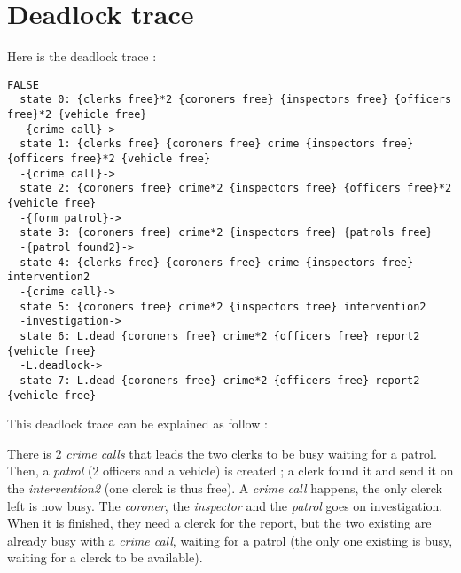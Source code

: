 \section{Deadlock trace}
\label{sec:Deadlock trace}

Here is the deadlock trace :

\begin{lstlisting}
FALSE
  state 0: {clerks free}*2 {coroners free} {inspectors free} {officers free}*2 {vehicle free}
  -{crime call}->
  state 1: {clerks free} {coroners free} crime {inspectors free} {officers free}*2 {vehicle free}
  -{crime call}->
  state 2: {coroners free} crime*2 {inspectors free} {officers free}*2 {vehicle free}
  -{form patrol}->
  state 3: {coroners free} crime*2 {inspectors free} {patrols free}
  -{patrol found2}->
  state 4: {clerks free} {coroners free} crime {inspectors free} intervention2
  -{crime call}->
  state 5: {coroners free} crime*2 {inspectors free} intervention2
  -investigation->
  state 6: L.dead {coroners free} crime*2 {officers free} report2 {vehicle free}
  -L.deadlock->
  state 7: L.dead {coroners free} crime*2 {officers free} report2 {vehicle free}
\end{lstlisting}

This deadlock trace can be explained as follow : \newline

There is 2 \textit{crime calls} that leads the two clerks to be busy waiting for a patrol. Then, a \textit{patrol} (2 officers and a vehicle) is created ; a clerk found it and send it on the \textit{intervention2} (one clerck is thus free). A \textit{crime call} happens, the only clerck left is now busy. The \textit{coroner}, the \textit{inspector} and the \textit{patrol} goes on investigation. When it is finished, they need a clerck for the report, but the two existing are already busy with a \textit{crime call}, waiting for a patrol (the only one existing is busy, waiting for a clerck to be available). \newline


